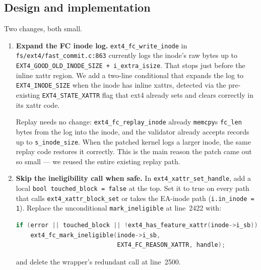\documentclass[12pt,a4paper]{article}
\begin{document}
\subsection{Design and implementation}

Two changes, both small.

\begin{enumerate}[leftmargin=*]
  \item \textbf{Expand the FC inode log.}
        \texttt{ext4\_fc\_write\_inode} in
        \texttt{fs/ext4/fast\_commit.c:863} currently logs the
        inode's raw bytes up to
        \texttt{EXT4\_GOOD\_OLD\_INODE\_SIZE + i\_extra\_isize}.
        That stops just before the inline xattr region.  We add a
        two-line conditional that expands the log to
        \texttt{EXT4\_INODE\_SIZE} when the inode has inline
        xattrs, detected via the pre-existing
        \texttt{EXT4\_STATE\_XATTR} flag that ext4 already sets
        and clears correctly in its xattr code.

        Replay needs no change: \texttt{ext4\_fc\_replay\_inode}
        already \texttt{memcpy}s \texttt{fc\_len} bytes from the
        log into the inode, and the validator already accepts
        records up to \texttt{s\_inode\_size}.  When the patched
        kernel logs a larger inode, the same replay code restores
        it correctly.  This is the main reason the patch came out
        so small --- we reused the entire existing replay path.

  \item \textbf{Skip the ineligibility call when safe.} In
        \texttt{ext4\_xattr\_set\_handle}, add a local
        \texttt{bool touched\_block = false} at the top. Set it
        to true on every path that calls
        \texttt{ext4\_xattr\_block\_set} or takes the EA-inode
        path (\texttt{i.in\_inode = 1}).  Replace the unconditional
        \texttt{mark\_ineligible} at line~2422 with:
\begin{lstlisting}[language=C]
if (error || touched_block || !ext4_has_feature_xattr(inode->i_sb))
    ext4_fc_mark_ineligible(inode->i_sb,
                            EXT4_FC_REASON_XATTR, handle);
\end{lstlisting}
        and delete the wrapper's redundant call at line~2500.


\end{enumerate}
\end{document}
